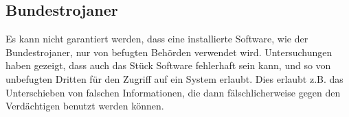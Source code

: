 \subsection*{Bundestrojaner}
Es kann nicht garantiert werden, dass eine installierte Software,
wie der Bundestrojaner, nur von befugten Behörden verwendet wird. 
Untersuchungen haben gezeigt, dass auch das Stück Software fehlerhaft 
sein kann, und so von unbefugten Dritten für den Zugriff auf ein System 
erlaubt. Dies erlaubt z.B. das
Unterschieben von falschen Informationen, die dann fälschlicherweise gegen
den Verdächtigen benutzt werden können.


%
%
%
%
%
%
%

